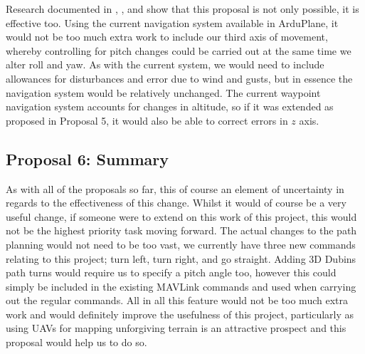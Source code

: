 Research documented in \cite{beard2013implementing}, \cite{hota2010optimal}, and \cite{lin2014path} show that this proposal is not only possible, it is effective too. Using the current navigation system available in ArduPlane, it would not be too much extra work to include our third axis of movement, whereby controlling for pitch changes could be carried out at the same time we alter roll and yaw. As with the current system, we would need to include allowances for disturbances and error due to wind and gusts, but in essence the navigation system would be relatively unchanged. The current waypoint navigation system accounts for changes in altitude, so if it was extended as proposed in Proposal 5, it would also be able to correct errors in $z$ axis. 

\subsection{Proposal 6: Summary} 
\label{future:3dsummary}

As with all of the proposals so far, this of course an element of uncertainty in regards to the effectiveness of this change. Whilst it would of course be a very useful change, if someone were to extend on this work of this project, this would not be the highest priority task moving forward. The actual changes to the path planning would not need to be too vast, we currently have three new commands relating to this project; turn left, turn right, and go straight. Adding 3D Dubins path turns would require us to specify a pitch angle too, however this could simply be included in the existing MAVLink commands and used when carrying out the regular commands. All in all this feature would not be too much extra work and would definitely improve the usefulness of this project, particularly as using UAVs for mapping unforgiving terrain is an attractive prospect and this proposal would help us to do so.

